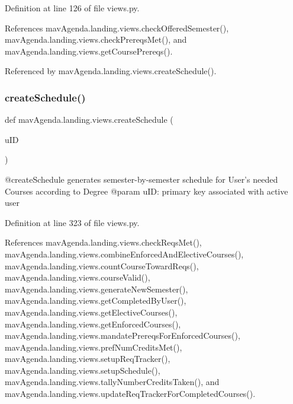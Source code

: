 Definition at line 126 of file views.\+py.



References mav\+Agenda.\+landing.\+views.\+check\+Offered\+Semester(), mav\+Agenda.\+landing.\+views.\+check\+Prereqs\+Met(), and mav\+Agenda.\+landing.\+views.\+get\+Course\+Prereqs().



Referenced by mav\+Agenda.\+landing.\+views.\+create\+Schedule().

\mbox{\label{namespacemavAgenda_1_1landing_1_1views_ae8b8edf7cc479127adfdee3c0ff1e9fe}} 
\subsubsection{\texorpdfstring{create\+Schedule()}{createSchedule()}}
{\footnotesize\ttfamily def mav\+Agenda.\+landing.\+views.\+create\+Schedule (\begin{DoxyParamCaption}\item[{}]{u\+ID }\end{DoxyParamCaption})}

\begin{DoxyVerb}@createSchedule generates semester-by-semester schedule for User's needed Courses according to Degree
@param uID: primary key associated with active user
\end{DoxyVerb}
 

Definition at line 323 of file views.\+py.



References mav\+Agenda.\+landing.\+views.\+check\+Reqs\+Met(), mav\+Agenda.\+landing.\+views.\+combine\+Enforced\+And\+Elective\+Courses(), mav\+Agenda.\+landing.\+views.\+count\+Course\+Toward\+Reqs(), mav\+Agenda.\+landing.\+views.\+course\+Valid(), mav\+Agenda.\+landing.\+views.\+generate\+New\+Semester(), mav\+Agenda.\+landing.\+views.\+get\+Completed\+By\+User(), mav\+Agenda.\+landing.\+views.\+get\+Elective\+Courses(), mav\+Agenda.\+landing.\+views.\+get\+Enforced\+Courses(), mav\+Agenda.\+landing.\+views.\+mandate\+Prereqs\+For\+Enforced\+Courses(), mav\+Agenda.\+landing.\+views.\+pref\+Num\+Credits\+Met(), mav\+Agenda.\+landing.\+views.\+setup\+Req\+Tracker(), mav\+Agenda.\+landing.\+views.\+setup\+Schedule(), mav\+Agenda.\+landing.\+views.\+tally\+Number\+Credits\+Taken(), and mav\+Agenda.\+landing.\+views.\+update\+Req\+Tracker\+For\+Completed\+Courses().



